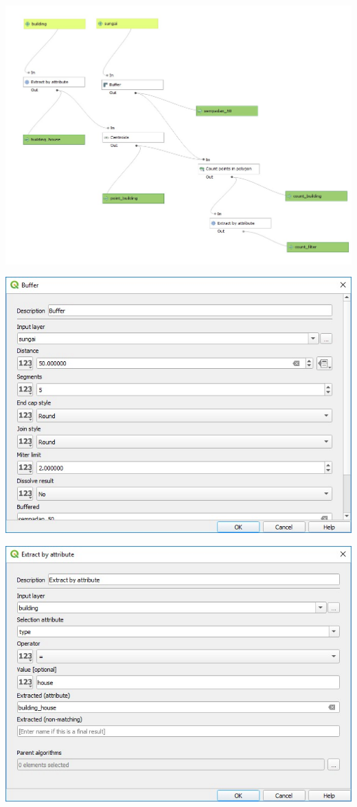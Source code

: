 \documentclass[]{book}
\begin{document}
\includegraphics{./img/gismodel4.png}

\includegraphics{./img/gismodel6.png}

\includegraphics{./img/gismodel7.png}
\end{document}
